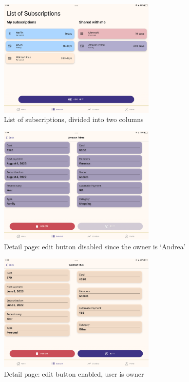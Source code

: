 \documentclass[12pt]{article}
\begin{document}
\begin{figure}[h!]
    \begin{center}
        \includegraphics[width=0.7\textwidth, clip]{../../assets/tablet/subsList.PNG}
    \end{center}
    \caption{List of subscriptions, divided into two columns}
    \label{fig:tsubsList}
\end{figure}

\begin{figure}[h!]
    \begin{center}
        \includegraphics[width=0.7\textwidth, clip]{../../assets/tablet/detail.PNG}
    \end{center}
    \caption{Detail page: edit button disabled since the owner is `Andrea'}
    \label{fig:tdetail}
\end{figure}

\begin{figure}[h!]
    \begin{center}
        \includegraphics[width=0.7\textwidth, clip]{../../assets/tablet/detailEd.PNG}
    \end{center}
    \caption{Detail page: edit button enabled, user is owner}
    \label{fig:detailEd}
\end{figure}
\end{document}
